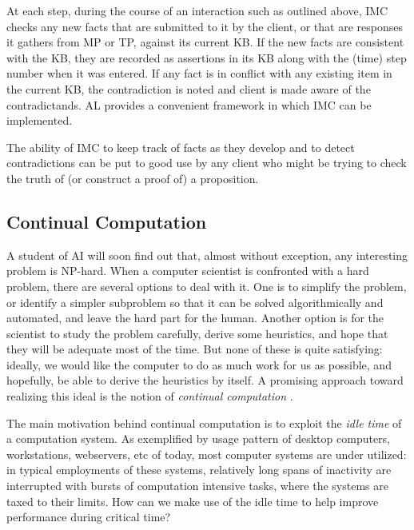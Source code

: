 At each step, during the course of an interaction such as outlined
above, IMC checks any new facts that are submitted to it by the
client, or that are responses it gathers from MP or TP, against its
current KB. If the new facts are consistent with the KB, they are
recorded as assertions in its KB along with the (time) step number
when it was entered. If any fact is in conflict with any existing item
in the current KB, the contradiction is noted and client is made aware
of the contradictands. AL provides a convenient framework
in which IMC can be implemented.

The ability of IMC to keep track of facts as they develop and to
detect contradictions can be put to good use by any client who might
be trying to check the truth of (or construct a proof of) a
proposition.


\subsection{Continual Computation}
A student of AI will soon find out that, almost without exception, any
interesting problem is NP-hard.  When a computer scientist is
confronted with a hard problem, there are several options to deal with it.
One is to simplify the problem, or identify a simpler subproblem so that it
can be solved algorithmically and automated, and leave the hard part for
the human.  Another option is for the scientist to study the problem
carefully, derive some heuristics, and hope that they will be adequate
most of the time.  But none of these is quite satisfying: ideally, we would
like the computer to do as much work for us as possible, and hopefully, be
able to derive the heuristics by itself.  A promising approach toward
realizing this ideal is the notion of \emph{continual computation}
\cite{horvitz1997:models_continual}.

The main motivation behind continual computation is to exploit the
\emph{idle time} of a computation system.  As exemplified by usage pattern
of desktop computers, workstations, webservers, etc of today, most computer
systems are under utilized: in typical employments of these systems,
relatively long spans of inactivity are interrupted with bursts of
computation intensive tasks, where the systems are taxed to their limits.
How can we make use of the idle time to help improve performance during
critical time?



